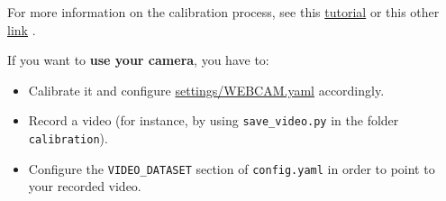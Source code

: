\documentclass{article}
\begin{document}
For more information on the calibration process, see this
\href{https://learnopencv.com/camera-calibration-using-opencv/}{tutorial} \cite{learnopencv}
or this other
\href{https://docs.opencv.org/4.x/dc/dbb/tutorial_py_calibration.html}{link} \cite{opencv}.

If you want to \textbf{use your camera}, you have to: 
\begin{itemize}
\item Calibrate it and configure \href{https://github.com/luigifreda/pyslam/blob/master/settings/WEBCAM.yaml}{settings/WEBCAM.yaml} accordingly.
\item Record a video (for instance, by using \texttt{save\_video.py} in the folder \texttt{calibration}). 
\item Configure the \texttt{VIDEO\_DATASET} section of \texttt{config.yaml} in order to point to your recorded video.
\end{itemize}
\end{document}
